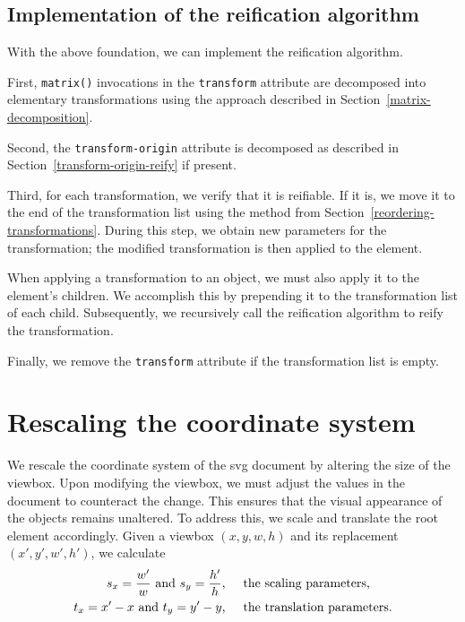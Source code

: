 \subsection{Implementation of the reification algorithm}

With the above foundation, we can implement the reification algorithm.

First, \texttt{matrix()} invocations in the \texttt{transform} attribute are decomposed into elementary transformations using the approach described in Section~\ref{matrix-decomposition}.

Second, the \texttt{transform-origin} attribute is decomposed as described in Section~\ref{transform-origin-reify} if present.

Third, for each transformation, we verify that it is reifiable. If it is, we move it to the end of the transformation list using the method from Section~\ref{reordering-transformations}. During this step, we obtain new parameters for the transformation; the modified transformation is then applied to the element.

When applying a transformation to an object, we must also apply it to the element's children. We accomplish this by prepending it to the transformation list of each child. Subsequently, we recursively call the reification algorithm to reify the transformation.

Finally, we remove the \texttt{transform} attribute if the transformation list is empty.

\section{Rescaling the coordinate system}\label{impl:rescaling}

We rescale the coordinate system of the \gls{svg} document by altering the size of the viewbox. Upon modifying the viewbox, we must adjust the values in the document to counteract the change. This ensures that the visual appearance of the objects remains unaltered. To address this, we scale and translate the root element accordingly. Given a viewbox $(x, y, w, h)$ and its replacement $\left(x', y', w', h'\right)$, we calculate
\begin{align}
    s_x = \frac{w'}{w} \text{ and } s_y = \frac{h'}{h}\text{,}\hspace{0.5cm}&\text{the scaling parameters,} \\
    t_x = x' - x \text{ and } t_y = y' - y\text{,}\hspace{0.5cm}&\text{the translation parameters.}
\end{align}

